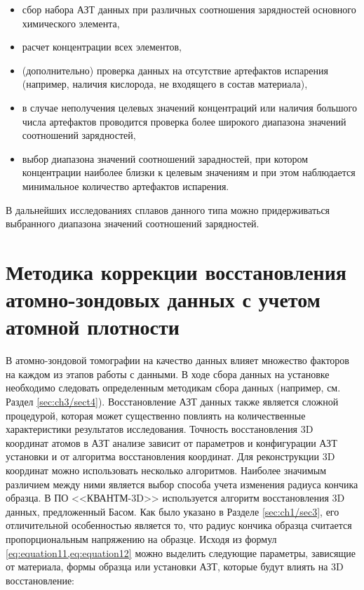 \begin{itemize}
	\item сбор набора АЗТ данных при различных соотношения зарядностей основного химического элемента,
	\item расчет концентрации всех элементов,	
	\item (дополнительно) проверка данных на отсутствие артефактов испарения (например, наличия кислорода, не входящего в состав материала),
	\item в случае неполучения целевых значений концентраций или наличия большого числа артефактов проводится проверка более широкого диапазона значений соотношений зарядностей,
	\item выбор диапазона значений соотношений зарадностей, при котором концентрации наиболее близки к целевым значениям и при этом наблюдается минимальное количество артефактов испарения.	
\end{itemize}

В дальнейших исследованиях сплавов данного типа можно придерживаться выбранного диапазона значений соотношений зарядностей.

\FloatBarrier



\section{Методика коррекции восстановления атомно-зондовых данных с учетом атомной плотности}\label{sec:ch3/sect5}

В атомно-зондовой томографии на качество данных влияет множество факторов на каждом из этапов работы с данными. В ходе сбора данных на установке необходимо следовать определенным методикам сбора данных (например, см. Раздел \cref{sec:ch3/sect4}). Восстановление АЗТ данных также является сложной процедурой, которая может существенно повлиять на количественные характеристики результатов исследования. Точность восстановления 3D координат атомов в АЗТ анализе зависит от параметров и конфигурации АЗТ установки и от алгоритма восстановления координат. Для реконструкции 3D координат можно использовать несколько алгоритмов. Наиболее значимым различием между ними является выбор способа учета изменения радиуса кончика образца. В ПО <<КВАНТМ-3D>> используется алгоритм восстановления 3D данных, предложенный Басом. Как было указано в Разделе \cref{sec:ch1/sec3}, его отличительной особенностью является то, что радиус кончика образца считается пропорциональным напряжению на образце. Исходя из формул \cref{eq:equation11,eq:equation12} можно выделить следующие параметры, зависящие от материала, формы образца или установки АЗТ, которые будут влиять на 3D восстановление:

